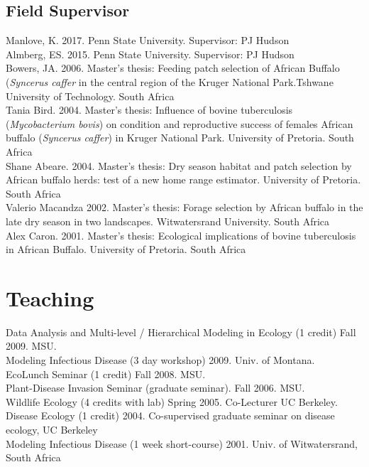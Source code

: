 \documentclass[12pt,]{article}
\begin{document}
\hypertarget{field-supervisor}{%
\subsection{Field Supervisor}\label{field-supervisor}}

Manlove, K. 2017. Penn State University. Supervisor: PJ Hudson\\
Almberg, ES. 2015. Penn State University. Supervisor: PJ Hudson\\
Bowers, JA. 2006. Master's thesis: Feeding patch selection of African
Buffalo (\emph{Syncerus caffer} in the central region of the Kruger
National Park.Tshwane University of Technology. South Africa\\
Tania Bird. 2004. Master's thesis: Influence of bovine tuberculosis
(\emph{Mycobacterium bovis}) on condition and reproductive success of
females African buffalo (\emph{Syncerus caffer}) in Kruger National
Park. University of Pretoria. South Africa\\
Shane Abeare. 2004. Master's thesis: Dry season habitat and patch
selection by African buffalo herds: test of a new home range estimator.
University of Pretoria. South Africa\\
Valerio Macandza 2002. Master's thesis: Forage selection by African
buffalo in the late dry season in two landscapes. Witwatersrand
University. South Africa\\
Alex Caron. 2001. Master's thesis: Ecological implications of bovine
tuberculosis in African Buffalo. University of Pretoria. South Africa

\hypertarget{teaching}{%
\section{Teaching}\label{teaching}}

Data Analysis and Multi-level / Hierarchical Modeling in Ecology (1
credit) Fall 2009. MSU.\\
Modeling Infectious Disease (3 day workshop) 2009. Univ. of Montana.\\
EcoLunch Seminar (1 credit) Fall 2008. MSU.\\
Plant-Disease Invasion Seminar (graduate seminar). Fall 2006. MSU.\\
Wildlife Ecology (4 credits with lab) Spring 2005. Co-Lecturer UC
Berkeley.\\
Disease Ecology (1 credit) 2004. Co-supervised graduate seminar on
disease ecology, UC Berkeley\\
Modeling Infectious Disease (1 week short-course) 2001. Univ. of
Witwatersrand, South Africa
\end{document}
